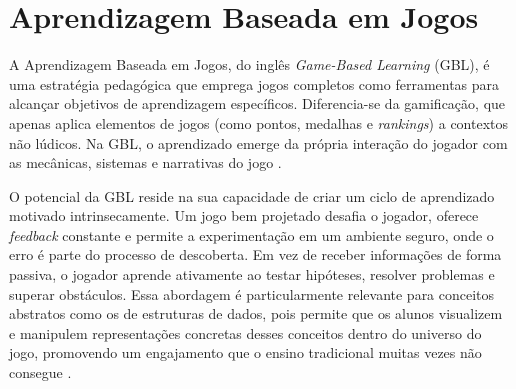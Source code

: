 \section{Aprendizagem Baseada em Jogos}

A Aprendizagem Baseada em Jogos, do inglês \emph{Game-Based Learning} (GBL), é
uma estratégia pedagógica que emprega jogos completos como ferramentas para
alcançar objetivos de aprendizagem específicos. Diferencia-se da gamificação,
que apenas aplica elementos de jogos (como pontos, medalhas e \emph{rankings}) a
contextos não lúdicos. Na GBL, o aprendizado emerge da própria interação do
jogador com as mecânicas, sistemas e narrativas do jogo
\cite{malone2021making}.

O potencial da GBL reside na sua capacidade de criar um ciclo de aprendizado
motivado intrinsecamente. Um jogo bem projetado desafia o jogador, oferece
\emph{feedback} constante e permite a experimentação em um ambiente seguro,
onde o erro é parte do processo de descoberta. Em vez de receber informações
de forma passiva, o jogador aprende ativamente ao testar hipóteses, resolver
problemas e superar obstáculos. Essa abordagem é particularmente relevante para
conceitos abstratos como os de estruturas de dados, pois permite que os alunos
visualizem e manipulem representações concretas desses conceitos dentro do
universo do jogo, promovendo um engajamento que o ensino tradicional muitas
vezes não consegue \cite{mtaho2024difficulties}.
